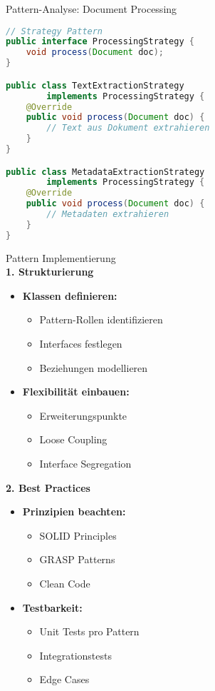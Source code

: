 \begin{example2}[breakable]{Pattern-Analyse: Document Processing}
\begin{lstlisting}[language=Java, style=basesmol]
// Strategy Pattern
public interface ProcessingStrategy {
    void process(Document doc);
}

public class TextExtractionStrategy 
        implements ProcessingStrategy {
    @Override
    public void process(Document doc) {
        // Text aus Dokument extrahieren
    }
}

public class MetadataExtractionStrategy 
        implements ProcessingStrategy {
    @Override
    public void process(Document doc) {
        // Metadaten extrahieren
    }
}
\end{lstlisting}
\end{example2}

\begin{KR}{Pattern Implementierung}\\
\textbf{1. Strukturierung}
\begin{itemize}
    \item \textbf{Klassen definieren:}
    \begin{itemize}
        \item Pattern-Rollen identifizieren
        \item Interfaces festlegen
        \item Beziehungen modellieren
    \end{itemize}
    
    \item \textbf{Flexibilität einbauen:}
    \begin{itemize}
        \item Erweiterungspunkte
        \item Loose Coupling
        \item Interface Segregation
    \end{itemize}
\end{itemize}

\textbf{2. Best Practices}
\begin{itemize}
    \item \textbf{Prinzipien beachten:}
    \begin{itemize}
        \item SOLID Principles
        \item GRASP Patterns
        \item Clean Code
    \end{itemize}
    
    \item \textbf{Testbarkeit:}
    \begin{itemize}
        \item Unit Tests pro Pattern
        \item Integrationstests
        \item Edge Cases
    \end{itemize}
\end{itemize}
\end{KR}


